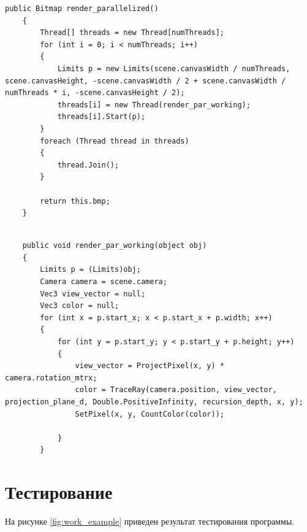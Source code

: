 \begin{lstlisting}[caption=Реализация главного потока параллельного алгоритма трассировки лучей,
	label={tras_main}]
public Bitmap render_parallelized()
	{
		Thread[] threads = new Thread[numThreads];
		for (int i = 0; i < numThreads; i++)
		{
			Limits p = new Limits(scene.canvasWidth / numThreads, scene.canvasHeight, -scene.canvasWidth / 2 + scene.canvasWidth / numThreads * i, -scene.canvasHeight / 2);
			threads[i] = new Thread(render_par_working);
			threads[i].Start(p);
		}
		foreach (Thread thread in threads)
		{
			thread.Join();
		}
		
		return this.bmp;
	}
\end{lstlisting}

\begin{lstlisting}[caption=Реализация рабочего потока параллельного алгоритма трассировки лучей,
	label={tras_work}]

	public void render_par_working(object obj)
	{
		Limits p = (Limits)obj;
		Camera camera = scene.camera;
		Vec3 view_vector = null;
		Vec3 color = null;
		for (int x = p.start_x; x < p.start_x + p.width; x++)
		{
			for (int y = p.start_y; y < p.start_y + p.height; y++)
			{
				view_vector = ProjectPixel(x, y) * camera.rotation_mtrx;
				color = TraceRay(camera.position, view_vector, projection_plane_d, Double.PositiveInfinity, recursion_depth, x, y);
				SetPixel(x, y, CountColor(color));
				
			}
		}
\end{lstlisting}

\section{Тестирование}

На рисунке \ref{fig:work_example} приведен результат тестирования программы.

